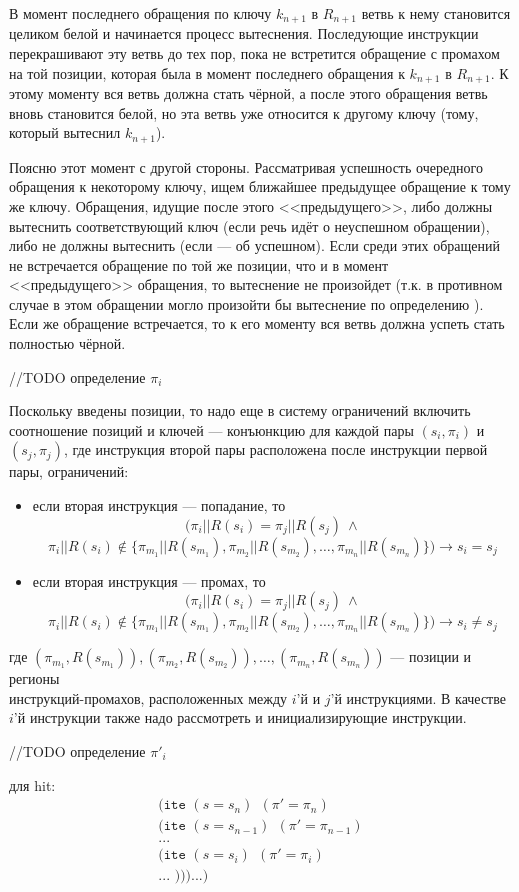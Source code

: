В момент последнего обращения по ключу $k_{n+1}$ в $R_{n+1}$ ветвь к нему становится целиком белой и начинается процесс вытеснения. Последующие инструкции перекрашивают эту ветвь до тех пор, пока не встретится обращение с промахом на той позиции, которая была в момент последнего обращения к $k_{n+1}$ в $R_{n+1}$. К этому моменту вся ветвь должна стать чёрной, а после этого обращения ветвь вновь становится белой, но эта ветвь уже относится к другому ключу (тому, который вытеснил $k_{n+1}$).

Поясню этот момент с другой стороны. Рассматривая успешность очередного обращения к некоторому ключу, ищем ближайшее предыдущее обращение к тому же ключу. Обращения, идущие после этого <<предыдущего>>, либо должны вытеснить соответствующий ключ (если речь идёт о неуспешном обращении), либо не должны вытеснить (если --- об успешном). Если среди этих обращений не встречается обращение по той же позиции, что и в момент <<предыдущего>> обращения, то вытеснение не произойдет (т.к. в противном случае в этом обращении могло произойти бы вытеснение по определению \PseudoLRU). Если же обращение встречается, то к его моменту вся ветвь должна успеть стать полностью чёрной.

//TODO определение $\pi_i$

Поскольку введены позиции, то надо еще в систему ограничений включить
соотношение позиций и ключей --- конъюнкцию для каждой пары $(s_i,\pi_i)$ и
$(s_j, \pi_j)$, где инструкция второй пары расположена после инструкции первой
пары, ограничений:
\begin{itemize}
    \item если вторая инструкция --- попадание, то $$(\pi_i||R(s_i) =
\pi_j||R(s_j)~\wedge$$ $$\pi_i||R(s_i) \notin \{\pi_{m_1}||R(s_{m_1}),
\pi_{m_2}||R(s_{m_2}), \dots, \pi_{m_n}||R(s_{m_n})\}) \rightarrow s_i = s_j$$
    \item если вторая инструкция --- промах, то $$(\pi_i||R(s_i) =
\pi_j||R(s_j)~\wedge$$ $$\pi_i||R(s_i) \notin \{\pi_{m_1}||R(s_{m_1}),
\pi_{m_2}||R(s_{m_2}), \dots, \pi_{m_n}||R(s_{m_n})\}) \rightarrow s_i \neq
s_j$$
\end{itemize}
где $(\pi_{m_1},R(s_{m_1})), (\pi_{m_2},R(s_{m_2})), \dots,
(\pi_{m_n},R(s_{m_n}))$ --- позиции и регионы\\инструкций-промахов,
расположенных между $i$'й и $j$'й инструкциями. В качестве $i$'й инструкции
также надо рассмотреть и инициализирующие инструкции.


//TODO определение $\pi'_i$

для hit: 
$$
\begin{array}{l}
\texttt{(ite~} (s = s_n) ~~ (\pi' = \pi_n)\\
\texttt{(ite~} (s = s_{n-1}) ~~ (\pi' = \pi_{n-1})\\
...\\
\texttt{(ite~} (s = s_i) ~~ (\pi' = \pi_i)\\
... \texttt{~)))...)}\\
\end{array}
$$

